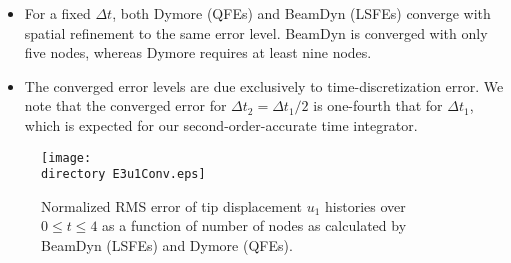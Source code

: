 \begin{itemize}

    \item For a fixed $\Delta t$, both Dymore (QFEs) and BeamDyn (LSFEs)
converge with spatial refinement to the same error level. BeamDyn is
converged with only five nodes, whereas Dymore requires at least nine nodes.

    \item  The converged error levels are due exclusively to
time-discretization error.  We note that the converged error for $\Delta t_2
= \Delta t_1/2$ is one-fourth that for $\Delta t_1$, which is expected for our
second-order-accurate time integrator.  


\end{itemize}  

\begin{figure}
    \centering
    \texttt{[image: \\directory E3u1Conv.eps]}
    \caption{Normalized RMS error of tip displacement $u_1$ histories over
$0 \leq t \leq 4$ as a function of number of nodes as calculated by BeamDyn
(LSFEs) and Dymore (QFEs).}
    \label{E3Conv}
\end{figure}
 
